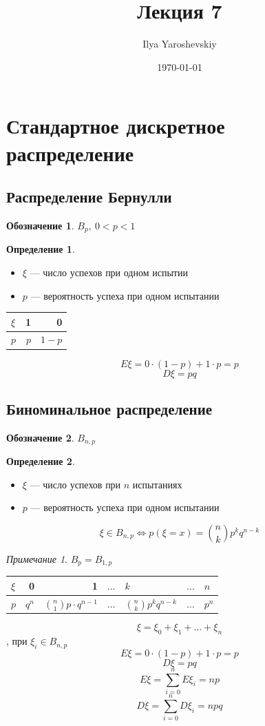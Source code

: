 \documentclass[english]{article}
\author{Ilya Yaroshevskiy}
\date{\today}
\title{Лекция 7}
\theoremstyle{plain}
\theoremstyle{remark}
\newtheorem*{remark}{Примечание}
\theoremstyle{definition}
\newtheorem*{definition}{Определение}
\newtheorem*{symb}{Обозначение}
\begin{document}
\maketitle
\tableofcontents


\section{Стандартное дискретное распределение}
\label{sec:orgec98cbb}
\subsection{Распределение Бернулли}
\label{sec:org2745e94}
\begin{symb}
\(B_p,\ 0 < p < 1\)
\end{symb}

\begin{definition}
\-
\begin{itemize}
\item \(\xi\) --- число успехов при одном испытии
\item \(p\) --- вероятность успеха при одном испытании
\end{itemize}
\end{definition}
\begin{center}
\begin{tabular}{l|rr}
\(\xi\) & 1 & 0\\
\hline
\(p\) & \(p\) & \(1 - p\)\\
\end{tabular}
\end{center}
\[ E\xi = 0\cdot(1 - p) + 1\cdot p = p \]
\[ D\xi = pq \]
\subsection{Биноминальное распределение}
\label{sec:orga4735ec}
\begin{symb}
\(B_{n,p}\)
\end{symb}
\begin{definition}
\-
\begin{itemize}
\item \(\xi\) --- число успехов при \(n\) испытаниях
\item \(p\) --- вероятность успеха при одном испытании
\end{itemize}
\[ \xi \in B_{n,p} \Leftrightarrow p(\xi = x) = \binom{n}{k}p^k q^{n - k} \]
\end{definition}
\begin{remark}
\(B_p = B_{1, p}\)
\end{remark}
\begin{center}
\begin{tabular}{l|rrllll}
\(\xi\) & 0 & 1 & \(\dots\) & \(k\) & \(\dots\) & \(n\)\\
\hline
\(p\) & \(q^n\) & \(\binom{n}{1}p\cdot q^{n - 1}\) & \(\dots\) & \(\binom{n}{k}p^kq^{n - k}\) & \(\dots\) & \(p^n\)\\
\end{tabular}
\end{center}
\[ \xi =\xi_0 + \xi_1 + \dots + \xi_n \]
, при \(\xi_i \in B_{n, p}\)
\[ E\xi = 0\cdot(1 - p) + 1\cdot p = p \]
\[ D\xi = pq \]
\[ E\xi = \sum_{i = 0}^n E\xi_i = np \]
\[ D\xi = \sum_{i = 0}^n D\xi_i = npq \]
\end{document}
